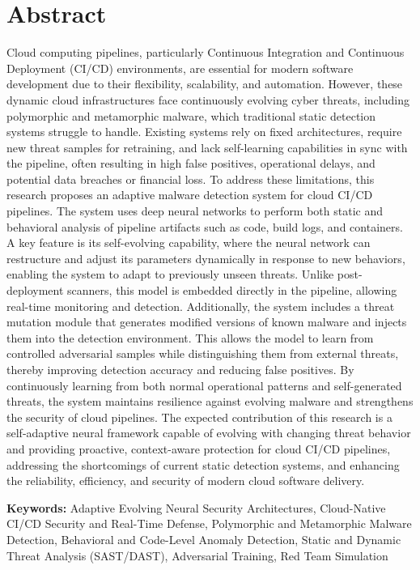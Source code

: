 \section*{Abstract}
Cloud computing pipelines, particularly Continuous Integration and Continuous Deployment (CI/CD) environments, are essential for modern software development due to their flexibility, scalability, and automation. However, these dynamic cloud infrastructures face continuously evolving cyber threats, including polymorphic and metamorphic malware, which traditional static detection systems struggle to handle. Existing systems rely on fixed architectures, require new threat samples for retraining, and lack self-learning capabilities in sync with the pipeline, often resulting in high false positives, operational delays, and potential data breaches or financial loss. To address these limitations, this research proposes an adaptive malware detection system for cloud CI/CD pipelines. The system uses deep neural networks to perform both static and behavioral analysis of pipeline artifacts such as code, build logs, and containers. A key feature is its self-evolving capability, where the neural network can restructure and adjust its parameters dynamically in response to new behaviors, enabling the system to adapt to previously unseen threats. Unlike post-deployment scanners, this model is embedded directly in the pipeline, allowing real-time monitoring and detection. Additionally, the system includes a threat mutation module that generates modified versions of known malware and injects them into the detection environment. This allows the model to learn from controlled adversarial samples while distinguishing them from external threats, thereby improving detection accuracy and reducing false positives. By continuously learning from both normal operational patterns and self-generated threats, the system maintains resilience against evolving malware and strengthens the security of cloud pipelines. The expected contribution of this research is a self-adaptive neural framework capable of evolving with changing threat behavior and providing proactive, context-aware protection for cloud CI/CD pipelines, addressing the shortcomings of current static detection systems, and enhancing the reliability, efficiency, and security of modern cloud software delivery.


\vspace{1cm}
\textbf{Keywords:} Adaptive Evolving Neural Security Architectures, Cloud-Native CI/CD Security and Real-Time Defense, Polymorphic and Metamorphic Malware Detection, Behavioral and Code-Level Anomaly Detection, Static and Dynamic Threat Analysis (SAST/DAST), Adversarial Training, Red Team Simulation
\pagebreak
